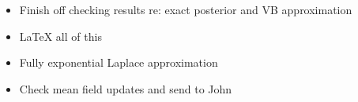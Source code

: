 \documentclass{amsart}
\begin{document}
\begin{itemize}
\item Finish off checking results re: exact posterior and VB approximation
\item LaTeX all of this
\item Fully exponential Laplace approximation
\item Check mean field updates and send to John
\end{itemize}
\end{document}
